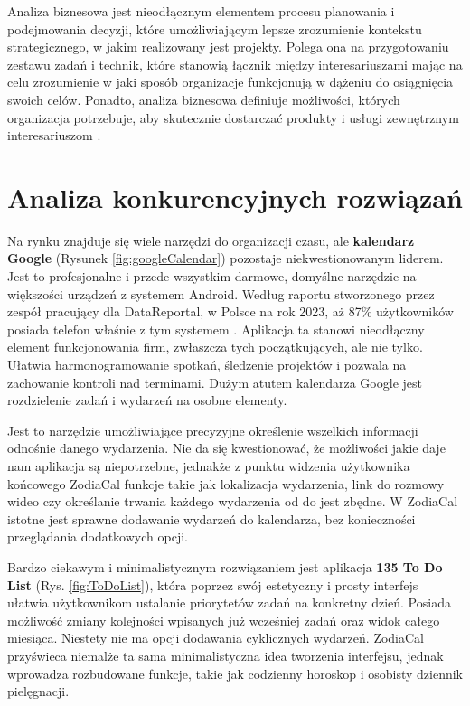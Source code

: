 Analiza biznesowa jest nieodłącznym elementem procesu planowania i podejmowania decyzji, które umożliwiającym lepsze zrozumienie kontekstu strategicznego, w jakim realizowany jest projekty. Polega ona na przygotowaniu zestawu zadań i technik, które stanowią łącznik między interesariuszami mając na celu zrozumienie w jaki sposób organizacje funkcjonują w dążeniu do osiągnięcia swoich celów. Ponadto, analiza biznesowa definiuje możliwości, których organizacja potrzebuje, aby skutecznie dostarczać produkty i usługi zewnętrznym interesariuszom \cite{businessanalysis}.

\section{Analiza konkurencyjnych rozwiązań}

Na rynku znajduje się wiele narzędzi do organizacji czasu, ale \textbf{kalendarz Google} (Rysunek \ref{fig:googleCalendar}) pozostaje niekwestionowanym liderem. Jest to profesjonalne i przede wszystkim darmowe, domyślne narzędzie na większości urządzeń z systemem Android.
Według raportu stworzonego przez zespół pracujący dla DataReportal, w Polsce na rok 2023, aż 87\% użytkowników posiada
telefon właśnie z tym systemem \cite{datareportal}. Aplikacja ta stanowi nieodłączny element funkcjonowania firm, zwłaszcza tych początkujących,
ale nie tylko. Ułatwia harmonogramowanie spotkań, śledzenie projektów i pozwala na zachowanie kontroli nad terminami.
Dużym atutem kalendarza Google jest rozdzielenie zadań i wydarzeń na osobne elementy.

Jest to narzędzie umożliwiające precyzyjne określenie wszelkich informacji odnośnie danego wydarzenia. Nie da się kwestionować, że możliwości jakie daje nam aplikacja są niepotrzebne, jednakże z punktu widzenia użytkownika końcowego ZodiaCal funkcje takie jak lokalizacja wydarzenia, link do rozmowy wideo czy określanie trwania każdego wydarzenia od do jest zbędne. W ZodiaCal istotne jest sprawne dodawanie wydarzeń do kalendarza, bez konieczności przeglądania dodatkowych opcji.

\newpage

Bardzo ciekawym i minimalistycznym rozwiązaniem jest aplikacja \textbf{135 To Do List} (Rys. \ref{fig:ToDoList}), która poprzez swój estetyczny
i prosty interfejs ułatwia użytkownikom ustalanie priorytetów zadań na konkretny dzień.
Posiada możliwość zmiany kolejności wpisanych już wcześniej zadań oraz widok całego miesiąca.
Niestety nie ma opcji dodawania cyklicznych wydarzeń. ZodiaCal przyświeca niemalże ta sama minimalistyczna idea tworzenia interfejsu, jednak wprowadza rozbudowane funkcje, takie jak codzienny horoskop i osobisty dziennik pielęgnacji.

